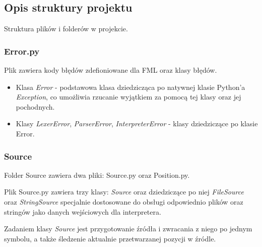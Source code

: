 \documentclass[12pt,a4paper]{article}
\begin{document}
\pagebreak
\subsection{Opis struktury projektu}

Struktura plików i folderów w projekcie.


\subsubsection{Error.py}

Plik zawiera kody błędów zdefioniowane dla FML oraz klasy błędów.

\begin{itemize}

\item Klasa \emph{Error} - podstawowa klasa dziedzicząca po natywnej klasie Python'a \emph{Exception}, co umożliwia rzucanie wyjątkiem za pomocą tej klasy oraz jej pochodnych.

\item Klasy \emph{LexerError}, \emph{ParserError}, \emph{InterpreterError} - klasy dziedziczące po klasie Error.

\end{itemize}

\subsubsection{Source}

Folder Source zawiera dwa pliki: Source.py oraz Position.py.

Plik Source.py zawiera trzy klasy: \emph{Source} oraz dziedziczące po niej \emph{FileSource} oraz \emph{StringSource} specjalnie dostosowane do obsługi odpowiednio plików oraz stringów jako danych wejściowych dla interpretera.

Zadaniem klasy \emph{Source} jest przygotowanie źródła i zwracania z niego po jednym symbolu, a także śledzenie aktualnie przetwarzanej pozycji w źródle.
\end{document}
